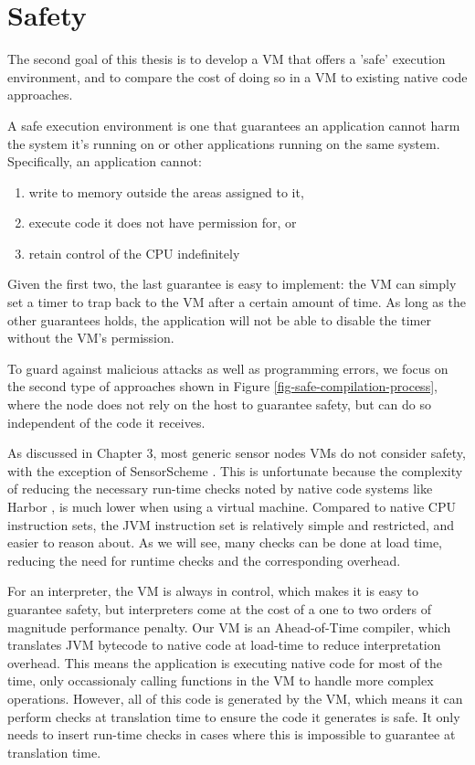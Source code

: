 \chapter{Safety}
\label{sec-safety}


The second goal of this thesis is to develop a VM that offers a 'safe' execution environment, and to compare the cost of doing so in a VM to existing native code approaches.

A safe execution environment is one that guarantees an application cannot harm the system it's running on or other applications running on the same system. Specifically, an application cannot:
\begin{enumerate}
	\item write to memory outside the areas assigned to it,
	\item execute code it does not have permission for, or
	\item retain control of the CPU indefinitely
\end{enumerate}

Given the first two, the last guarantee is easy to implement: the VM can simply set a timer to trap back to the VM after a certain amount of time. As long as the other guarantees holds, the application will not be able to disable the timer without the VM's permission.

To guard against malicious attacks as well as programming errors, we focus on the second type of approaches shown in Figure \ref{fig-safe-compilation-process}, where the node does not rely on the host to guarantee safety, but can do so independent of the code it receives.

As discussed in Chapter 3, most generic sensor nodes VMs do not consider safety, with the exception of SensorScheme \cite{Evers:2010ur}. This is unfortunate because the complexity of reducing the necessary run-time checks noted by native code systems like Harbor \cite{Kumar:2007ge}, is much lower when using a virtual machine. Compared to native CPU instruction sets, the JVM instruction set is relatively simple and restricted, and easier to reason about. As we will see, many checks can be done at load time, reducing the need for runtime checks and the corresponding overhead.

For an interpreter, the VM is always in control, which makes it is easy to guarantee safety, but interpreters come at the cost of a one to two orders of magnitude performance penalty. Our VM is an Ahead-of-Time compiler, which translates JVM bytecode to native code at load-time to reduce interpretation overhead. This means the application is executing native code for most of the time, only occassionaly calling functions in the VM to handle more complex operations. However, all of this code is generated by the VM, which means it can perform checks at translation time to ensure the code it generates is safe. It only needs to insert run-time checks in cases where this is impossible to guarantee at translation time.

